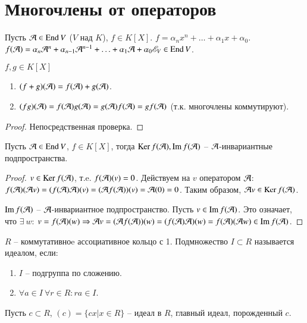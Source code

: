 \documentclass[main]{subfiles}
\begin{document}
\chapter{Многочлены от операторов}

Пусть $\mathcal{A} \in \operatorname{End} V$ ($V$ над $K$), $f \in K[X]$. $f = \alpha_n x^n + \ldots + \alpha_1 x + \alpha_0$.
$f(\mathcal{A}) = \alpha_n {\mathcal{A}}^n + \alpha_{n-1} {\mathcal{A}}^{n-1} + \ldots + \alpha_1 \mathcal{A} + \alpha_0 \mathscr{E}_V \in \operatorname{End} V$.

\begin{proposition}
    $f, g \in K[X]$
    \begin{enumerate}
        \item $(f+g)(\mathcal{A}) = f(\mathcal{A}) + g(\mathcal{A})$.
        \item $(fg)(\mathcal{A}) = f(\mathcal{A})g(\mathcal{A}) =g(\mathcal{A})f(\mathcal{A})=gf(\mathcal{A})$ (т.к. многочлены коммутируют).
    \end{enumerate}
\end{proposition}

\begin{proof}
    Непосредственная проверка.
\end{proof}

\begin{corollary}
    Пусть $\mathcal{A} \in \operatorname{End} V$, $f \in K[X]$, тогда $\operatorname{Ker} f(\mathcal{A}), \operatorname{Im} f(\mathcal{A})$ -- $\mathcal{A}$-инвариантные подпространства.
\end{corollary}

\begin{proof}
    $v \in \operatorname{Ker} f(\mathcal{A})$, т.e. $f(\mathcal{A}) (v) = 0$. Действуем на $v$ оператором $\mathcal{A}$: $f(\mathcal{A})(\mathcal{A} v) =
        (f(\mathcal{A})\mathcal{A})(v) = (\mathcal{A} f(\mathcal{A}))(v) = \mathcal{A}(0) = 0$.
    Таким образом, $\mathcal{A} v \in \operatorname{Ker} f(\mathcal{A})$.

    $\operatorname{Im} f(\mathcal{A})$ -- $\mathcal{A}$-инвариантное подпространство.
    Пусть $v \in \operatorname{Im} f(\mathcal{A})$. Это означает, что $\exists \ w$: $v = f(\mathcal{A})(w) \Rightarrow
        \mathcal{A} v = (\mathcal{A} f(\mathcal{A}))(w) = (f(\mathcal{A})\mathcal{A})(w) = f(\mathcal{A})(\mathcal{A} w) \in \operatorname{Im} f(\mathcal{A})$.
\end{proof}

$R$ -- коммутативноe ассоциативное кольцо с 1. Подмножество $I\subset R$ называется идеалом, если:
\begin{enumerate}
    \item $I$ -- подгруппа по сложению.
    \item $\forall a \in I \ \forall r \in R : ra \in I$.
\end{enumerate}

Пусть $c \subset R$, $(c) = \{cx | x \in R\}$ -- идеал в $R$, главный идеал, порожденный $c$.
\end{document}
